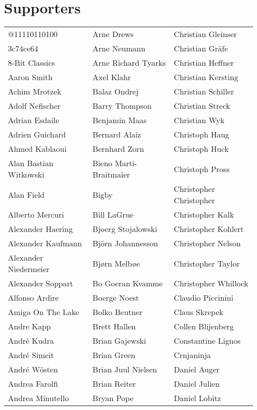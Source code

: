 \newpage
\section{Supporters}
\begin{small}
\setlength{\tabcolsep}{1mm}
\begin{tabular}{p{4cm}p{4cm}p{4cm}}
@11110110100 & Arne Drews & Christian Gleinser \\
3c74ce64 & Arne Neumann & Christian Gräfe \\
8-Bit Classics & Arne Richard Tyarks & Christian Heffner \\
Aaron Smith & Axel Klahr & Christian Kersting \\
Achim Mrotzek & Balaz Ondrej & Christian Schiller \\
Adolf Nefischer & Barry Thompson & Christian Streck \\
Adrian Esdaile & Benjamin Maas & Christian Wyk \\
Adrien Guichard & Bernard Alaiz & Christoph Haug \\
Ahmed Kablaoui & Bernhard Zorn & Christoph Huck \\
Alan Bastian Witkowski & Bieno Marti-Braitmaier & Christoph Pross \\
Alan Field & Bigby & Christopher Christopher \\
Alberto Mercuri & Bill LaGrue & Christopher Kalk \\
Alexander Haering & Bjoerg Stojalowski & Christopher Kohlert \\
Alexander Kaufmann & Björn Johannesson & Christopher Nelson \\
Alexander Niedermeier & Bjørn Melbøe & Christopher Taylor \\
Alexander Soppart & Bo Goeran Kvamme & Christopher Whillock \\
Alfonso Ardire & Boerge Noest & Claudio Piccinini \\
Amiga On The Lake & Bolko Beutner & Claus Skrepek \\
Andre Kapp & Brett Hallen & Collen Blijenberg \\
André Kudra & Brian Gajewski & Constantine Lignos \\
André Simeit & Brian Green & Crnjaninja \\
André Wösten & Brian Juul Nielsen & Daniel Auger \\
Andrea Farolfi & Brian Reiter & Daniel Julien \\
Andrea Minutello & Bryan Pope & Daniel Lobitz \\

\end{tabular}
\end{small}
